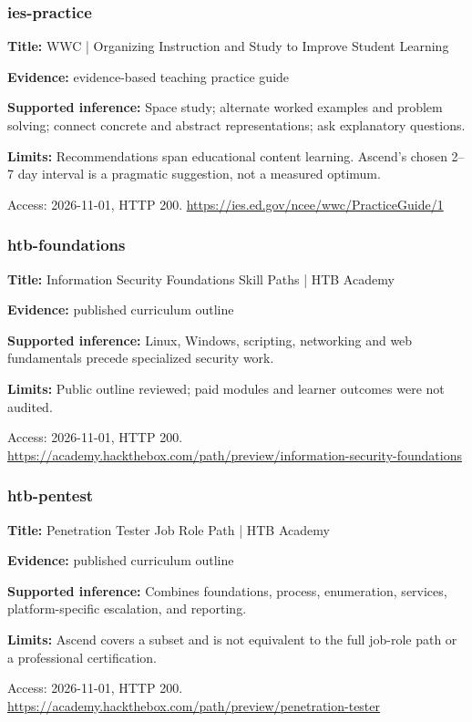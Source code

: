 \subsubsection{ies-practice}
\noindent\textbf{Title:} WWC | Organizing Instruction and Study to Improve Student Learning\par
\noindent\textbf{Evidence:} evidence-based teaching practice guide\par
\noindent\textbf{Supported inference:} Space study; alternate worked examples and problem solving; connect concrete and abstract representations; ask explanatory questions.\par
\noindent\textbf{Limits:} Recommendations span educational content learning. Ascend’s chosen 2–7 day interval is a pragmatic suggestion, not a measured optimum.\par
\noindent Access: 2026-11-01, HTTP 200. \url{https://ies.ed.gov/ncee/wwc/PracticeGuide/1}
\subsubsection{htb-foundations}
\noindent\textbf{Title:} Information Security Foundations Skill Paths | HTB Academy\par
\noindent\textbf{Evidence:} published curriculum outline\par
\noindent\textbf{Supported inference:} Linux, Windows, scripting, networking and web fundamentals precede specialized security work.\par
\noindent\textbf{Limits:} Public outline reviewed; paid modules and learner outcomes were not audited.\par
\noindent Access: 2026-11-01, HTTP 200. \url{https://academy.hackthebox.com/path/preview/information-security-foundations}
\subsubsection{htb-pentest}
\noindent\textbf{Title:} Penetration Tester Job Role Path | HTB Academy\par
\noindent\textbf{Evidence:} published curriculum outline\par
\noindent\textbf{Supported inference:} Combines foundations, process, enumeration, services, platform-specific escalation, and reporting.\par
\noindent\textbf{Limits:} Ascend covers a subset and is not equivalent to the full job-role path or a professional certification.\par
\noindent Access: 2026-11-01, HTTP 200. \url{https://academy.hackthebox.com/path/preview/penetration-tester}
